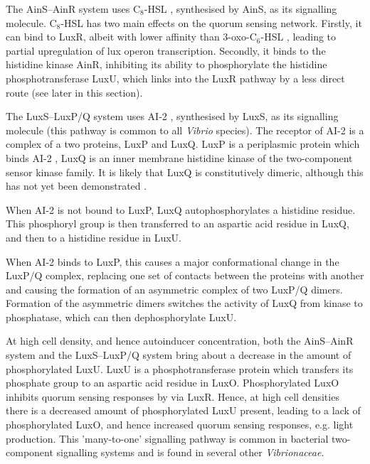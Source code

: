 The AinS–AinR system uses C$_8$-HSL , synthesised by AinS, as its signalling molecule\cite{Lupp2003, Miyashiro2012,Gilson1995}. C$_8$-HSL  has two main effects on the quorum sensing network. Firstly, it can bind to LuxR\cite{Schaefer1996}, albeit with lower affinity than 3-oxo-C$_6$-HSL , leading to partial upregulation of lux operon transcription.
Secondly, it binds to the histidine kinase AinR, inhibiting its ability to phosphorylate the histidine phosphotransferase LuxU, which links into the LuxR pathway by a less direct route (see later in this section)\cite{Timmen2006}.  


The LuxS–LuxP/Q system uses AI-2 , synthesised by LuxS, as its signalling molecule\cite{Miyashiro2012,Neiditch2005,Neiditch2006} (this pathway is common to all \textit{Vibrio} species\cite{Miyashiro2012}). The receptor of AI-2  is a complex of a two proteins, LuxP and LuxQ. LuxP is a periplasmic protein which binds AI-2 , LuxQ is an inner membrane histidine kinase of the two-component sensor kinase family\cite{Bassler1994}. It is likely that LuxQ is constitutively dimeric, although this has not yet been demonstrated \cite{Stock2000}. 

When AI-2  is not bound to LuxP, LuxQ autophosphorylates a histidine residue\cite{Neiditch2006}. This phosphoryl group is then transferred to an aspartic acid residue in LuxQ, and then to a histidine residue in LuxU. 

When AI-2  binds to LuxP, this causes a major conformational change in the LuxP/Q complex, replacing one set of contacts between the proteins with another\cite{Neiditch2005,Neiditch2006} and causing the formation of an asymmetric complex of two LuxP/Q dimers. Formation of the asymmetric dimers switches the activity of LuxQ from kinase to phosphatase, which can then dephosphorylate LuxU.

At high cell density, and hence autoinducer concentration, both the AinS–AinR system and the LuxS–LuxP/Q system bring about a decrease in the amount of phosphorylated LuxU. LuxU is a phosphotransferase protein which transfers its phosphate group to an aspartic acid residue in LuxO\cite{Freeman1999}. Phosphorylated LuxO inhibits quorum sensing responses by via LuxR. Hence, at high cell densities there is a decreased amount of phosphorylated LuxU present, leading to a lack of phosphorylated LuxO, and hence increased quorum sensing responses, e.g. light production. This 'many-to-one' signalling pathway is common in bacterial two-component signalling systems \cite{Laub2007} and is found in several other \textit{Vibrionaceae}\cite{Milton2006}.

